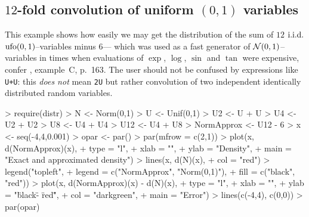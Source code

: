 \documentclass[11pt]{article}
\begin{document}
\subsection{$12$-fold convolution of uniform $(0,1)$ variables}
\begin{small}
  This example shows how easily we may get the distribution of the sum of $12$
  ${\rm i.i.d.}$ ${\rm ufo}(0,1)$--variables minus $6$--- which was used as a 
  fast generator of ${\cal N}(0,1)$--variables in times when evaluations of 
  $\exp$, $\log$, $\sin$ and $\tan$ were expensive, confer
  \cite{Ric:88}, example~C, p.~163. The user should not be confused by
   expressions  like {\tt U+U}: this {\em does not\/} mean {\tt 2U}
  but rather convolution of two independent identically distributed 
  random variables.
\end{small}
\begin{Schunk}
\begin{Sinput}
> require(distr)
> N <- Norm(0,1)
> U <- Unif(0,1)
> U2 <- U + U 
> U4 <- U2 + U2
> U8 <- U4 + U4
> U12 <- U4 + U8
> NormApprox <- U12 - 6
> x <- seq(-4,4,0.001)
> opar <- par()
> par(mfrow = c(2,1))
> plot(x, d(NormApprox)(x),
+      type = "l",
+      xlab = "",
+      ylab = "Density",
+      main = "Exact and approximated density")
> lines(x, d(N)(x),
+       col = "red")
> legend("topleft",
+        legend = c("NormApprox", "Norm(0,1)"),
+        fill = c("black", "red"))
> plot(x, d(NormApprox)(x) - d(N)(x),
+      type = "l",
+      xlab = "",
+      ylab = "\"black\" - \"red\"",
+      col = "darkgreen",
+      main = "Error")
> lines(c(-4,4), c(0,0))
> par(opar)
\end{Sinput}
\end{Schunk}
\end{document}
